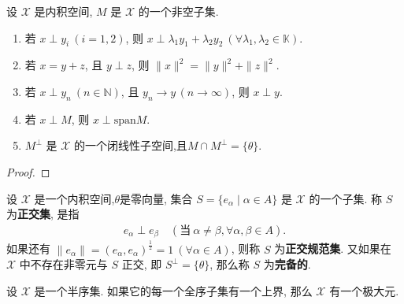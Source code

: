 \documentclass[../../main.tex]{subfiles}%
\begin{document}
\begin{proposition}\label{proposition:正交的基本性质}
设 $\mathscr{X}$ 是内积空间, $M$ 是 $\mathscr{X}$ 的一个非空子集.
\begin{enumerate}[(1)]
\item\label{proposition:正交的基本性质-1} 若 $x\perp y_i\ (i=1,2)$, 则 $x\perp\lambda_1y_1+\lambda_2y_2\ (\forall\lambda_1,\lambda_2\in\mathbb{K})$.

\item\label{proposition:正交的基本性质-2} 若 $x=y+z$, 且 $y\perp z$, 则 $\|x\|^2=\|y\|^2+\|z\|^2$.

\item\label{proposition:正交的基本性质-3} 若 $x\perp y_n\ (n\in\mathbb{N})$, 且 $y_n\to y\,(n\to \infty)$, 则 $x\perp y$.

\item\label{proposition:正交的基本性质-4} 若 $x\perp M$, 则 $x\perp\text{span}M$.

\item\label{proposition:正交的基本性质-5} $M^\perp$ 是 $\mathscr{X}$ 的一个闭线性子空间,且$M\cap M^{\bot}=\{\theta\}$.
\end{enumerate}
\end{proposition}
\begin{proof}


\end{proof}

\begin{definition}
设 $\mathscr{X}$ 是一个内积空间,$\theta$是零向量, 集合 $S=\{e_\alpha\mid\alpha\in A\}$ 是 $\mathscr{X}$ 的一个子集. 称 $S$ 为\textbf{正交集}, 是指
\begin{align*}
e_\alpha\perp e_\beta\quad(\text{当}\ \alpha\neq\beta,\forall\alpha,\beta\in A).
\end{align*}
如果还有 $\|e_\alpha\|=(e_\alpha,e_\alpha)^{\frac{1}{2}}=1\ (\forall\alpha\in A)$, 则称 $S$ 为\textbf{正交规范集}. 又如果在 $\mathscr{X}$ 中不存在非零元与 $S$ 正交, 即 $S^\perp=\{\theta\}$, 那么称 $S$ 为\textbf{完备的}.
\end{definition}

\begin{lemma}[Zorn引理]\label{lemma:泛函分析--Zorn引理}
设 $\mathscr{X}$ 是一个半序集. 如果它的每一个全序子集有一个上界, 那么 $\mathscr{X}$ 有一个极大元.
\end{lemma}
\end{document}
